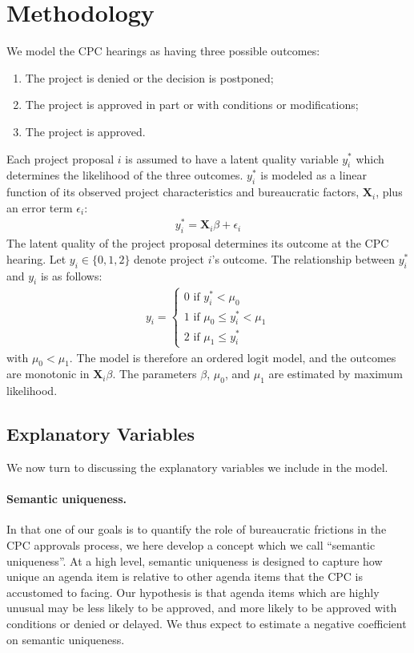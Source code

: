 \section{Methodology}\label{sec_methodology}

We model the CPC hearings as having three possible outcomes:
\begin{enumerate}[start=0]
\item The project is denied or the decision is postponed;
\item The project is approved in part or with conditions or modifications;
\item The project is approved.
\end{enumerate}
Each project proposal $i$ is assumed to have a latent quality variable $y_i^\ast$ which determines the likelihood of the three outcomes. $y_i^\ast$ is modeled as a linear function of its observed project characteristics and bureaucratic factors, $\mathbf{X}_i$, plus an error term $\epsilon_i$:
\begin{align}
y_i^\ast = \mathbf{X}_i \beta + \epsilon_i
\end{align}
The latent quality of the project proposal determines its outcome at the CPC hearing. Let $y_{i} \in \{0, 1, 2\}$ denote project $i$'s outcome. The relationship between $y_i^\ast$ and $y_i$ is as follows:
\begin{align}
y_i = \begin{cases}
0 \text{ if } y_i^\ast < \mu_0 \\
1 \text{ if } \mu_0 \leq y_i^\ast < \mu_1 \\
2 \text{ if } \mu_1 \leq y_i^\ast
\end{cases}
\end{align}
with $\mu_0 < \mu_1$. The model is therefore an ordered logit model, and the outcomes are monotonic in $\mathbf{X}_i \beta$. The parameters $\beta$, $\mu_0$, and $\mu_1$ are estimated by maximum likelihood.

\subsection{Explanatory Variables}

We now turn to discussing the explanatory variables we include in the model.

\paragraph{Semantic uniqueness.} In that one of our goals is to quantify the role of bureaucratic frictions in the CPC approvals process, we here develop a concept which we call ``semantic uniqueness''. At a high level, semantic uniqueness is designed to capture how unique an agenda item is relative to other agenda items that the CPC is accustomed to facing. Our hypothesis is that agenda items which are highly unusual may be less likely to be approved, and more likely to be approved with conditions or denied or delayed. We thus expect to estimate a negative coefficient on semantic uniqueness.


